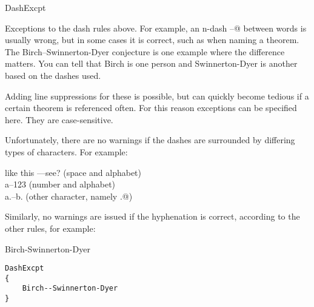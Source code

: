 \begin{chktexrclistvar}{DashExcpt}

Exceptions to the dash rules above.  For example, an n-dash
\verb@--@ between words is usually wrong, but in some cases it is correct,
such as when naming a theorem.  The Birch--Swinnerton-Dyer
conjecture is one example where the difference matters.  You can
tell that Birch is one person and Swinnerton-Dyer is another based
on the dashes used.

Adding line suppressions for these is possible, but can quickly
become tedious if a certain theorem is referenced often.  For this
reason exceptions can be specified here.  They are case-sensitive.

Unfortunately, there are no warnings if the dashes are surrounded by differing
types of characters.  For example:
\begin{errexam}
like this ---see? (space and alphabet)  \\
a--123            (number and alphabet) \\
a.--b.            (other character, namely \verb@.@)
\end{errexam}
Similarly, no warnings are issued if the hyphenation is correct,
according to the other rules, for example:
\begin{errexam}
Birch-Swinnerton-Dyer
\end{errexam}

\chktexrcdefault\begin{verbatim}
DashExcpt
{
    Birch--Swinnerton-Dyer
}
\end{verbatim}
\end{chktexrclistvar}


